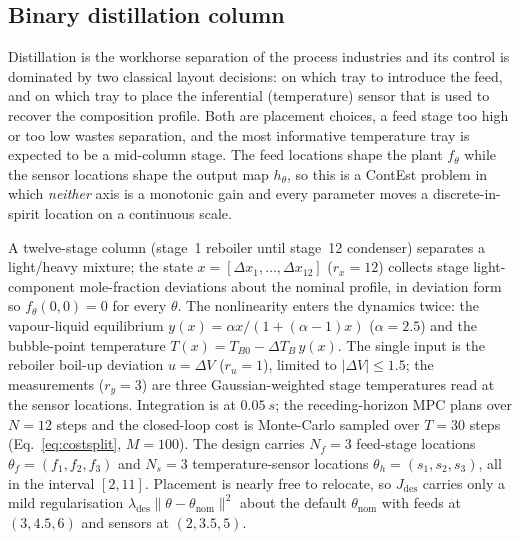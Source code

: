 \documentclass[twocolumn,amsthm]{autart}
\begin{document}
\subsection{Binary distillation column}
\label{sec:sim:distill}

Distillation is the workhorse separation of the process
industries and its control is dominated by two classical layout decisions: on
which tray to introduce the feed, and on which tray to place the
inferential (temperature) sensor that is used to recover the composition
profile. Both are placement choices, a
feed stage too high or too low wastes separation, and the most informative
temperature tray is expected to be a mid-column stage. The feed
locations shape the plant $f_\theta$ while the sensor locations shape the output map
$h_\theta$, so this is a ContEst problem in which \emph{neither} axis is a monotonic
gain and every parameter moves a discrete-in-spirit location on a continuous scale.

A twelve-stage column (stage~1 reboiler
until stage~12 condenser) separates a light/heavy mixture; the state
$x=[\Delta x_1,\dots,\Delta x_{12}]$ ($r_x=12$) collects stage light-component
mole-fraction deviations about the nominal profile, in deviation form so
$f_\theta(0,0)=0$ for every $\theta$. The nonlinearity enters the dynamics twice: the vapour-liquid equilibrium
$y(x)=\alpha x/(1+(\alpha-1)x)$ ($\alpha=2.5$) and the bubble-point temperature
$T(x)=T_{B0}-\Delta T_B\,y(x)$. The single input is the reboiler boil-up
deviation $u=\Delta V$ ($r_u=1$), limited to $|\Delta V|\le1.5$; the measurements
($r_y=3$) are three Gaussian-weighted stage temperatures read at the sensor
locations. Integration is at $\SI{0.05}{s}$; the receding-horizon MPC plans over
$N=12$ steps and the closed-loop cost is Monte-Carlo sampled over $T=30$ steps
(Eq.~\eqref{eq:costsplit}, $M=100$). The design carries
$N_f=3$ feed-stage locations $\theta_f=(f_1,f_2,f_3)$ and $N_s=3$
temperature-sensor locations $\theta_h=(s_1,s_2,s_3)$, all in the interval $[2,11]$. Placement is nearly free to relocate,
so $J_{\mathrm{des}}$ carries only a mild regularisation
$\lambda_{\mathrm{des}}\lVert\theta-\theta_{\mathrm{nom}}\rVert^2$ about the
default $\theta_{\mathrm{nom}}$ with feeds at $(3,4.5,6)$ and sensors at
$(2,3.5,5)$.
\end{document}
